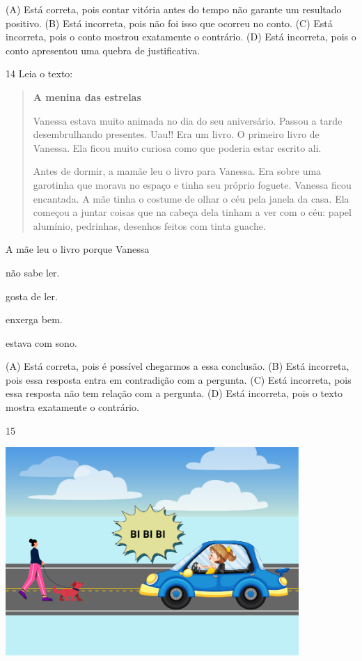 
(A) Está correta, pois contar vitória antes do tempo não garante um resultado positivo.
(B) Está incorreta, pois não foi isso que ocorreu no conto.
(C) Está incorreta, pois o conto mostrou exatamente o contrário.
(D) Está incorreta, pois o conto apresentou uma quebra de justificativa.

\num{14} Leia o texto:

\begin{quote}
\textbf{A menina das estrelas}

Vanessa estava muito animada no dia do seu aniversário. Passou a tarde
desembrulhando presentes. Uau!! Era um livro. O primeiro livro de
Vanessa. Ela ficou muito curiosa como que poderia estar escrito ali.

Antes de dormir, a mamãe leu o livro para Vanessa. Era sobre uma
garotinha que morava no espaço e tinha seu próprio foguete. Vanessa
ficou encantada. A mãe tinha o costume de olhar o céu pela janela da
casa. Ela começou a juntar coisas que na cabeça dela tinham a ver com o
céu: papel alumínio, pedrinhas, desenhos feitos com tinta guache.
\end{quote}


A mãe leu o livro porque Vanessa

\begin{escolha}
\item não sabe ler.

\item gosta de ler.

\item enxerga bem.

\item estava com sono.
\end{escolha}


(A) Está correta, pois é possível chegarmos a essa conclusão.
(B) Está incorreta, pois essa resposta entra em contradição com a pergunta.
(C) Está incorreta, pois essa resposta não tem relação com a pergunta.
(D) Está incorreta, pois o texto mostra exatamente o contrário.

\num{15}

\includegraphics[width=4.38462in,height=3.11119in]{media/image182.png}

